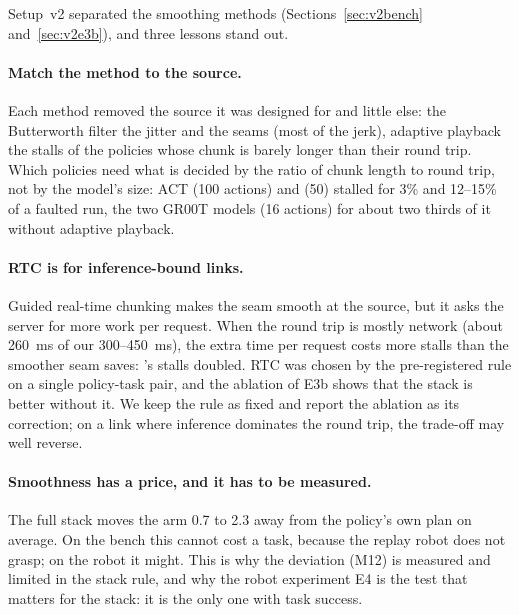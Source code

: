 Setup~v2 separated the smoothing methods (Sections~\ref{sec:v2bench} and~\ref{sec:v2e3b}), and three lessons stand out.

\paragraph{Match the method to the source.} Each method removed the source it was designed for and little else: the
Butterworth filter the jitter and the seams (most of the jerk), adaptive playback the stalls of the policies whose
chunk is barely longer than their round trip. Which policies need what is decided by the ratio of chunk length to
round trip, not by the model's size: ACT (100 actions) and \smolvla{} (50) stalled for 3\% and 12--15\% of a faulted
run, the two GR00T models (16 actions) for about two thirds of it without adaptive playback.

\paragraph{RTC is for inference-bound links.} Guided real-time chunking makes the seam smooth at the source, but it
asks the server for more work per request. When the round trip is mostly network (about 260~ms of our 300--450~ms),
the extra time per request costs more stalls than the smoother seam saves: \smolvla's stalls doubled. RTC was chosen
by the pre-registered rule on a single policy-task pair, and the ablation of E3b shows that the stack is better
without it. We keep the rule as fixed and report the ablation as its correction; on a link where inference dominates
the round trip, the trade-off may well reverse.

\paragraph{Smoothness has a price, and it has to be measured.} The full stack moves the arm 0.7 to 2.3\degree{} away
from the policy's own plan on average. On the bench this cannot cost a task, because the replay robot does not grasp;
on the robot it might. This is why the deviation (M12) is measured and limited in the stack rule, and why the robot
experiment E4 is the test that matters for the stack: it is the only one with task success.

